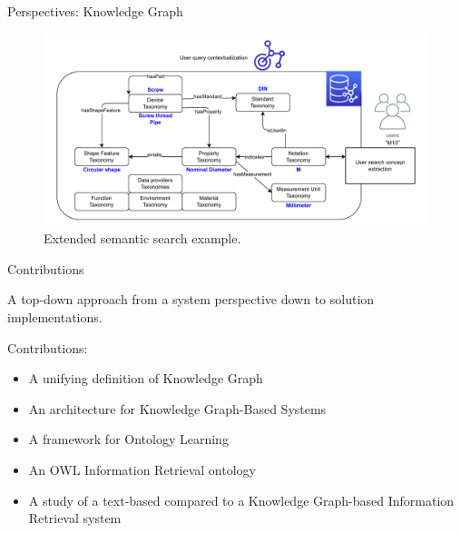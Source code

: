 \begin{frame}{Perspectives: Knowledge Graph}

    \begin{figure} [H]
        \begin{center}
            \includegraphics[scale=0.5]{images/semantic_search_example.pdf} 
            \caption{Extended semantic search example.} 
        \end{center}
    \end{figure}

\end{frame}

\begin{frame}{Contributions}

    \begin{center}
        A top-down approach from a system perspective down to solution implementations.
    \end{center}

    Contributions:
    \begin{itemize}
        \item A unifying definition of Knowledge Graph
        \item An architecture for Knowledge Graph-Based Systems
        \item A framework for Ontology Learning
        \item An OWL Information Retrieval ontology
        \item A study of a text-based compared to a Knowledge Graph-based Information Retrieval system
    \end{itemize}
    
\end{frame}

